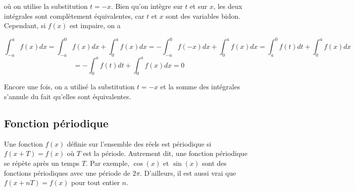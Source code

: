 où on utilise la substitution $t = -x$. Bien qu'on intègre sur $t$ et sur $x$, les deux intégrales sont complètement équivalentes, car $t$ et $x$ sont des variables bidon. Cependant, si $f(x)$ est impaire, on a 

\begin{equation*}
    \int_{-a}^{a}f(x)dx = \int_{-a}^{0}f(x)dx + \int_{0}^{a}f(x)dx = -\int_{-a}^{0}f(-x)dx + \int_{0}^{a}f(x)dx = \int_{a}^{0}f(t)dt + \int_{0}^{a}f(x)dx
\end{equation*}
\begin{equation*}
    = -\int_{0}^{a}f(t)dt + \int_{0}^{a}f(x)dx = 0
\end{equation*}

Encore une fois, on a utilisé la substitution $t = -x$ et la somme des intégrales s'annule du fait qu'elles sont équivalentes. 





\subsection{Fonction périodique}
Une fonction $f(x)$ définie sur l'ensemble des réels est périodique si $f(x + T) = f(x)$ où $T$ est la période. Autrement dit, une fonction périodique se répète après un temps $T$. Par exemple, $\cos(x)$ et $\sin(x)$ sont des fonctions périodiques avec une période de $2\pi$. D'ailleurs, il est aussi vrai que $f(x+nT) = f(x)$ pour tout entier $n$.

